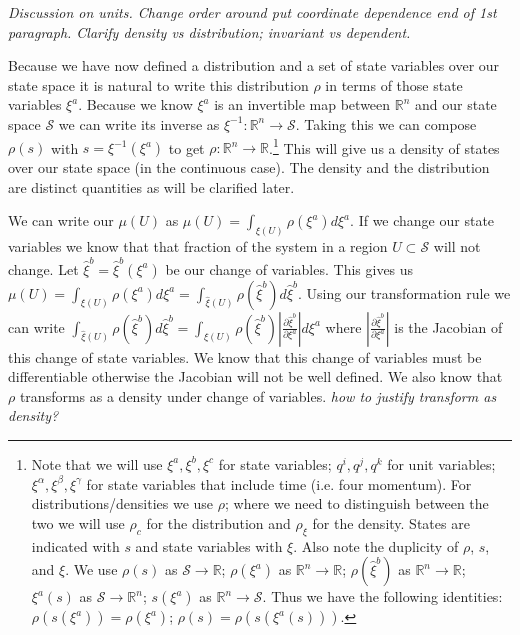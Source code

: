 \documentclass{article}
\begin{document}
\emph{Discussion on units. Change order around put coordinate dependence end of 1st paragraph. Clarify density vs distribution; invariant vs dependent.} 
	
	Because we have now defined a distribution and a set of state variables over our state space it is natural to write this distribution $\rho$ in terms of those state variables $\xi^a$. Because we know $\xi^a$ is an invertible map between $\mathbb{R}^n$ and our state space $\mathcal{S}$ we can write its inverse as $\xi^{-1} : \mathbb{R}^n \to \mathcal{S}$. Taking this we can compose $\rho(s)$ with $s = \xi^{-1}(\xi^a)$ to get $\rho : \mathbb{R}^n \to \mathbb{R}$.\footnote{Note that we will use $\xi^a, \xi^b, \xi^c$ for state variables; $q^i, q^j, q^k$ for unit variables; $\xi^\alpha, \xi^\beta, \xi^\gamma$ for state variables that include time (i.e. four momentum). For distributions/densities we use $\rho$; where we need to distinguish between the two we will use $\rho_c$ for the distribution and $\rho_\xi$ for the density. States are indicated with $s$ and state variables with $\xi$. Also note the duplicity of $\rho$, $s$, and $\xi$. We use $\rho(s)$ as $\mathcal{S} \to \mathbb{R}$; $\rho(\xi^a)$ as $\mathbb{R}^n \to \mathbb{R}$; $\rho(\hat{\xi}^b)$ as $\mathbb{R}^n \to \mathbb{R}$; $\xi^a(s)$ as $\mathcal{S} \to \mathbb{R}^n$; $s(\xi^a)$ as $\mathbb{R}^n \to \mathcal{S}$.
Thus we have the following identities: $\rho(s(\xi^a)) = \rho(\xi^a)$; $\rho(s) = \rho(s (\xi^a(s)))$.} This will give us a density of states over our state space (in the continuous case). The density and the distribution are distinct quantities as will be clarified later.

	We can write our $\mu(U)$ as $\mu(U) = \int_{\xi(U)} \rho(\xi^a)d\xi^a$. If we change our state variables we know that that fraction of the system in a region $U \subset \mathcal{S}$ will not change. Let $\hat{\xi}^b = \hat{\xi}^b(\xi^a)$ be our change of variables. This gives us $\mu(U) = \int_{\xi(U)} \rho(\xi^a)d\xi^a = \int_{\hat{\xi}(U)} \rho(\hat{\xi}^b)d\hat{\xi}^b$. Using our transformation rule we can write $\int_{\hat{\xi}(U)} \rho(\hat{\xi}^b)d\hat{\xi}^b = \int_{\xi(U)} \rho(\hat{\xi}^b)\left|\frac{\partial\hat{\xi}^b}{\partial\xi^a}\right|d\xi^a$ where $\left|\frac{\partial\hat{\xi}^b}{\partial\xi^a}\right|$ is the Jacobian of this change of state variables. We know that this change of variables must be differentiable otherwise the Jacobian will not be well defined. We also know that $\rho$ transforms as a density under change of variables. \emph{how to justify transform as density?}
\end{document}
